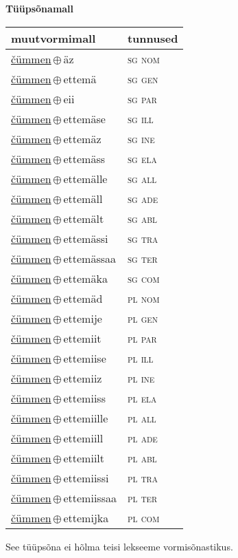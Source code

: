 

\vspace{3.5em}
\noindent \begin{minipage}{\textwidth}
\noindent \textbf{Tüüpsõnamall \,}\\

\begin{sideways}
\begin{tabular}{l l}
muutvormimall & tunnused \\
\hline
\underline{čümmen}\,$\oplus$\,äz & \textsc{ sg nom } \\
\underline{čümmen}\,$\oplus$\,ettemä & \textsc{ sg gen } \\
\underline{čümmen}\,$\oplus$\,eii & \textsc{ sg par } \\
\underline{čümmen}\,$\oplus$\,ettemäse & \textsc{ sg ill } \\
\underline{čümmen}\,$\oplus$\,ettemäz & \textsc{ sg ine } \\
\underline{čümmen}\,$\oplus$\,ettemäss & \textsc{ sg ela } \\
\underline{čümmen}\,$\oplus$\,ettemälle & \textsc{ sg all } \\
\underline{čümmen}\,$\oplus$\,ettemäll & \textsc{ sg ade } \\
\underline{čümmen}\,$\oplus$\,ettemält & \textsc{ sg abl } \\
\underline{čümmen}\,$\oplus$\,ettemässi & \textsc{ sg tra } \\
\underline{čümmen}\,$\oplus$\,ettemässaa & \textsc{ sg ter } \\
\underline{čümmen}\,$\oplus$\,ettemäka & \textsc{ sg com } \\
\underline{čümmen}\,$\oplus$\,ettemäd & \textsc{ pl nom } \\
\underline{čümmen}\,$\oplus$\,ettemije & \textsc{ pl gen } \\
\underline{čümmen}\,$\oplus$\,ettemiit & \textsc{ pl par } \\
\underline{čümmen}\,$\oplus$\,ettemiise & \textsc{ pl ill } \\
\underline{čümmen}\,$\oplus$\,ettemiiz & \textsc{ pl ine } \\
\underline{čümmen}\,$\oplus$\,ettemiiss & \textsc{ pl ela } \\
\underline{čümmen}\,$\oplus$\,ettemiille & \textsc{ pl all } \\
\underline{čümmen}\,$\oplus$\,ettemiill & \textsc{ pl ade } \\
\underline{čümmen}\,$\oplus$\,ettemiilt & \textsc{ pl abl } \\
\underline{čümmen}\,$\oplus$\,ettemiissi & \textsc{ pl tra } \\
\underline{čümmen}\,$\oplus$\,ettemiissaa & \textsc{ pl ter } \\
\underline{čümmen}\,$\oplus$\,ettemijka & \textsc{ pl com } \\
\end{tabular}
\end{sideways}
\label{tab:tüüpsõnamall-čümmenäz}

\end{minipage}

 
\vspace{1em}
\noindent See tüüpsõna ei hõlma teisi lekseeme vormi\-sõnastikus.
